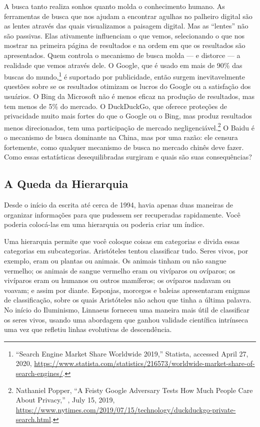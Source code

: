 A busca tanto realiza sonhos quanto molda o conhecimento humano. As ferramentas de busca que
nos ajudam a encontrar agulhas no palheiro digital são as lentes através das quais
visualizamos a paisagem digital. Mas as ``lentes'' não são passivas. Elas ativamente
influenciam o que vemos, selecionando o que nos mostrar na primeira página de resultados e na
ordem em que os resultados são apresentados. Quem controla o mecanismo de busca molda --- e
distorce --- a realidade que vemos através dele. O Google, que é usado em mais de 90\% das
buscas do mundo,\footnote{``Search Engine Market Share Worldwide 2019,'' Statista, accessed
April 27, 2020, \url{https://www.statista.com/statistics/216573/worldwide-market-share-of-search-engines/}.}
é suportado por publicidade, então surgem inevitavelmente questões sobre se os resultados
otimizam os lucros do Google ou a satisfação dos usuários. O Bing da Microsoft não é menos
eficaz na produção de resultados, mas tem menos de 5\% do mercado. O DuckDuckGo, que oferece
proteções de privacidade muito mais fortes do que o Google ou o Bing, mas produz resultados
menos direcionados, tem uma participação de mercado negligenciável.\footnote{Nathaniel Popper,
``A Feisty Google Adversary Tests How Much People Care About Privacy,'' , July 15, 2019, \url{https://www.nytimes.com/2019/07/15/technology/duckduckgo-private-search.html}.}
O Baidu é o mecanismo de busca dominante na China, mas por uma razão: ele censura fortemente,
como qualquer mecanismo de busca no mercado chinês deve fazer. Como essas estatísticas
desequilibradas surgiram e quais são suas consequências?

\subsection{A Queda da Hierarquia}
\label{gatekeepers:a-queda}

Desde o início da escrita até cerca de 1994, havia apenas duas maneiras de organizar
informações para que pudessem ser recuperadas rapidamente. Você poderia colocá-las em uma
hierarquia ou poderia criar um índice.

Uma hierarquia permite que você coloque coisas em categorias e divida essas categorias em
subcategorias. Aristóteles tentou classificar tudo. Seres vivos, por exemplo, eram ou plantas
ou animais. Os animais tinham ou não sangue vermelho; os animais de sangue vermelho eram ou
vivíparos ou ovíparos; os vivíparos eram ou humanos ou outros mamíferos; os ovíparos nadavam
ou voavam; e assim por diante. Esponjas, morcegos e baleias apresentaram enigmas de
classificação, sobre os quais Aristóteles não achou que tinha a última palavra. No início do
Iluminismo, Linnaeus forneceu uma maneira mais útil de classificar os seres vivos, usando uma
abordagem que ganhou validade científica intrínseca uma vez que refletiu linhas evolutivas de
descendência.

